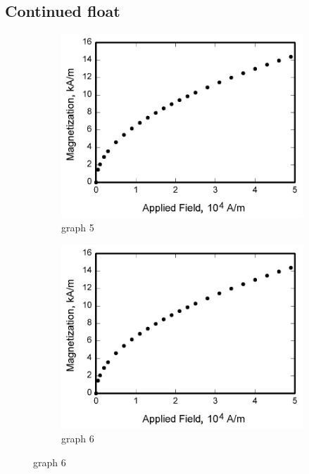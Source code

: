 \subsection{Continued float}
\begin{figure}[H]
    \centering
    \begin{subfigure}[t]{0.48\textwidth}
        \centering
        \includegraphics[width=1.0\textwidth]{Images/graph.jpg}
        \caption{graph 5}
        \label{subfig:graph5}
    \end{subfigure}
    \hfill
    \begin{subfigure}[t]{0.48\textwidth}
        \centering
        \includegraphics[width=1.0\textwidth]{Images/graph.jpg}
        \caption{graph 6}
        \label{subfig:graph6}
    \end{subfigure}
\end{figure}%
